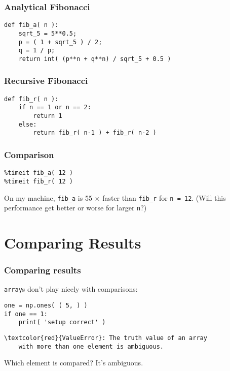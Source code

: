 \documentclass[11pt]{beamer}
\begin{document}
\begin{frame}[fragile]
  \frametitle{Analytical Fibonacci}
  \Enlarge

  \begin{Verbatim}
def fib_a( n ):
    sqrt_5 = 5**0.5;
    p = ( 1 + sqrt_5 ) / 2;
    q = 1 / p;
    return int( (p**n + q**n) / sqrt_5 + 0.5 )
  \end{Verbatim}
\end{frame}

\begin{frame}[fragile]
  \frametitle{Recursive Fibonacci}
  \Enlarge

  \begin{Verbatim}
def fib_r( n ):
    if n == 1 or n == 2:
        return 1
    else:
        return fib_r( n-1 ) + fib_r( n-2 )
  \end{Verbatim}
\end{frame}

\begin{frame}[fragile]
  \frametitle{Comparison}
  \Enlarge

  \begin{Verbatim}
%timeit fib_a( 12 )
%timeit fib_r( 12 )
  \end{Verbatim}
  \pause
  \begin{enumerate}
  \myitem  On my machine, \texttt{fib\_a} is 55 $\times$ faster than \texttt{fib\_r} for \texttt{n = 12}.  (Will this performance get better or worse for larger \texttt{n}?)
  \end{enumerate}
\end{frame}

\section{Comparing Results}

\begin{frame}[fragile]
  \frametitle{Comparing results}
  \Enlarge

  \begin{enumerate}
  \myitem  \texttt{array}s don't play nicely with comparisons:
  \begin{Verbatim}
one = np.ones( ( 5, ) )
if one == 1:
    print( 'setup correct' )
  \end{Verbatim}
  \pause
  \begin{Verbatim}[commandchars=\\\{\},commentchar=\%]
\textcolor{red}{ValueError}: The truth value of an array
    with more than one element is ambiguous.
  \end{Verbatim}
  \pause
  \myitem  Which element is compared?  It's ambiguous.
  \end{enumerate}
\end{frame}
\end{document}
